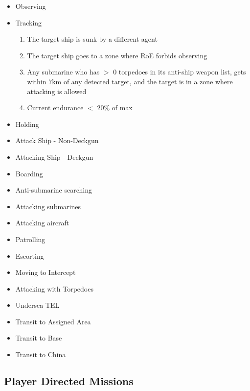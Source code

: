\documentclass{article}
\begin{document}
\begin{itemize}
    \item Observing

    \item Tracking
            \begin{enumerate}[label=\arabic*)]
            \item The target ship is sunk by a different agent \par
            [New Mission: Player-assigned mission]
            \item The target ship goes to a zone where RoE forbids observing \par
            [New Mission: Player-assigned mission]
            \item Any submarine who has $>$ 0 torpedoes in its anti-ship weapon list, gets within 7km of any detected target, and the target is in a zone where attacking is allowed \par
            [New Mission: Attacking with Torpedoes]
            \item Current endurance $<$ 20\% of max \par
            [New Mission: Transit to base]
        \end{enumerate}
    \item Holding
    \item Attack Ship - Non-Deckgun
    \item Attacking Ship - Deckgun
    \item Boarding
    \item Anti-submarine searching
    \item Attacking submarines
    \item Attacking aircraft
    \item Patrolling
    \item Escorting
    \item Moving to Intercept
    \item Attacking with Torpedoes
    \item Undersea TEL
    \item Transit to Assigned Area
    \item Transit to Base
    \item Transit to China
\end{itemize}

\subsection{Player Directed Missions}
\end{document}
